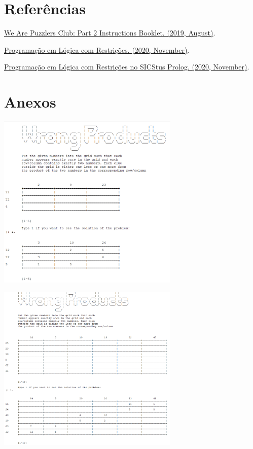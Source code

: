 \documentclass[11pt]{article}
\begin{document}
\bigskip
\bigskip

\section{Referências} 


\href{https://logicmastersindia.com/lmitests/dl.asp?attachmentid=790&view=1}{We Are Puzzlers Club: Part 2 Instructions Booklet. (2019, August)}.

\bigskip

\href{https://moodle.up.pt/pluginfile.php/60682/mod_resource/content/13/PLR.pdf}{Programação em Lógica com Restrições. (2020, November)}. 

\bigskip

\href{https://moodle.up.pt/pluginfile.php/60683/mod_resource/content/10/PLR%20SICStus.pdf}{Programação em Lógica com Restrições
no SICStus Prolog. (2020, November)}. 
\pagebreak

\section{Anexos}

\begin{center}
\includegraphics[width=0.65\textwidth]{dimension3.png}

\bigskip
\bigskip

\includegraphics[width=0.65\textwidth]{dimension6.png}
\end{center}
\end{document}
